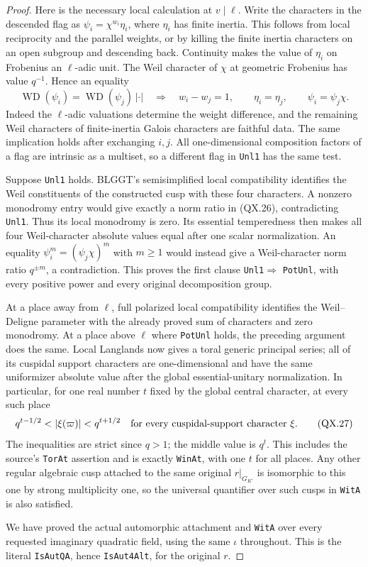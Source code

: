 \begin{proof}
Here is the necessary local calculation at
$v\mid\ell$.  Write the characters in the
descended flag as
$\psi_i=\chi^{w_i}\eta_i$, where $\eta_i$
has finite inertia.  This follows from local
reciprocity and the parallel weights, or by
killing the finite inertia characters on an
open subgroup and descending back.  Continuity
makes the value of $\eta_i$ on Frobenius an
$\ell$-adic unit.  The Weil character of
$\chi$ at geometric Frobenius has value
$q^{-1}$.  Hence an equality
\[
 \operatorname{WD}(\psi_i)
   =\operatorname{WD}(\psi_j)\,|\cdot|
 \quad\Longrightarrow\quad
 w_i-w_j=1,\qquad \eta_i=\eta_j,\qquad
 \psi_i=\psi_j\chi.
 \tag{QX.26}
\]
Indeed the $\ell$-adic valuations determine the
weight difference, and the remaining Weil
characters of finite-inertia Galois characters
are faithful data.  The same implication holds
after exchanging $i,j$.  All one-dimensional
composition factors of a flag are intrinsic
as a multiset, so a different flag in
\texttt{Unl1} has the same test.

Suppose \texttt{Unl1} holds.  BLGGT's
semisimplified local compatibility identifies
the Weil constituents of the constructed cusp
with these four characters.  A nonzero
monodromy entry would give exactly a norm
ratio in (QX.26), contradicting \texttt{Unl1}.
Thus its local monodromy is zero.  Its
essential temperedness then makes all four
Weil-character absolute values equal after
one scalar normalization.  An equality
$\psi_i^m=(\psi_j\chi)^m$ with $m\ge1$
would instead give a Weil-character norm ratio
$q^{\pm m}$, a contradiction.  This proves
the first clause \texttt{Unl1}$\Rightarrow$
\texttt{PotUnl}, with every positive power
and every original decomposition group.

At a place away from $\ell$, full polarized
local compatibility identifies the Weil--Deligne
parameter with the already proved sum of
characters and zero monodromy.  At a place
above $\ell$ where \texttt{PotUnl} holds,
the preceding argument does the same.  Local
Langlands now gives a toral generic principal
series; all of its cuspidal support characters
are one-dimensional and have the same
uniformizer absolute value after the global
essential-unitary normalization.  In particular,
for one real number $t$ fixed by the global
central character, at every such place
\[
          q^{t-1/2}<|\xi(\varpi)|<q^{t+1/2}
          \quad\hbox{for every cuspidal-support character }\xi.
          \tag{QX.27}
\]
The inequalities are strict since $q>1$; the
middle value is $q^t$.  This includes the
source's \texttt{TorAt} assertion and is
exactly \texttt{WinAt}, with one $t$ for
all places.  Any other regular algebraic cusp
attached to the same original $r|_{G_{K'}}$
is isomorphic to this one by strong multiplicity
one, so the universal quantifier over such
cusps in \texttt{WitA} is also satisfied.

We have proved the actual automorphic attachment
and \texttt{WitA} over every requested imaginary
quadratic field, using the same $\iota$ throughout.
This is the literal \texttt{IsAutQA}, hence
\texttt{IsAut4Alt}, for the original $r$.
\end{proof}

